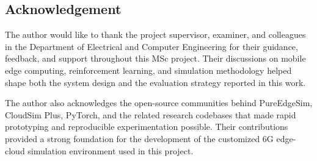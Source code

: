 \newpage
\begin{center}
  \section*{Acknowledgement}
\end{center}

The author would like to thank the project supervisor, examiner, and colleagues in the Department of Electrical and Computer Engineering for their guidance, feedback, and support throughout this MSc project. Their discussions on mobile edge computing, reinforcement learning, and simulation methodology helped shape both the system design and the evaluation strategy reported in this work.

The author also acknowledges the open-source communities behind PureEdgeSim, CloudSim Plus, PyTorch, and the related research codebases that made rapid prototyping and reproducible experimentation possible. Their contributions provided a strong foundation for the development of the customized 6G edge-cloud simulation environment used in this project.
